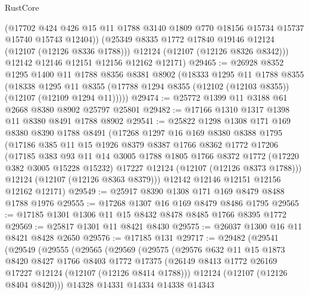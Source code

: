 \begin{lexlean}{RustCore}
\begin{coremodule}
          (@17702
            @424
            @426
            @15
            @11
            @1788
            @3140
            @1809
            @770
            @18156
            @15734
            @15737
            @15740
            @15743
            @12404))
        (@25349 @8335 @1772 @17840 @19146 @12124 (@12107 (@12126 @8336 @1788)))
        @12124
        (@12107 (@12126 @8326 @8342)))
      @12142
      @12146
      @12151
      @12156
      @12162
      @12171)
@29465 := @26928
    @8352
    @1295
    @1400
    @11
    @1788
    @8356
    @8381
    @8902
    (@18333
      @1295
      @11
      @1788
      @8355
      (@18338
        @1295
        @11
        @8355
        (@17788 @1294 @8355 (@12102 (@12103 @8355)) (@12107 (@12109 @1294 @11)))))
@29474 := @25772 @1399 @11 @3188 @61 @2668 @8380 @8902 @25797 @25801
@29482 := @17166 @1310 @1317 @1398 @11 @8380 @8491 @1788 @8902
@29541 := @25822
    @1298
    @1308
    @171
    @169
    @8380
    @8390
    @1788
    @8491
    (@17268
      @1297
      @16
      @169
      @8380
      @8388
      @1795
      (@17186
        @385
        @11
        @15
        @1926
        @8379
        @8387
        @1766
        @8362
        @1772
        @17206
        (@17185
          @383
          @93
          @11
          @14
          @3005
          @1788
          @1805
          @1766
          @8372
          @1772
          (@17220 @382 @3005 @15228 @15232)
          @17227
          @12124
          (@12107 (@12126 @8373 @1788)))
        @12124
        (@12107 (@12126 @8363 @8379)))
      @12142
      @12146
      @12151
      @12156
      @12162
      @12171)
@29549 := @25917 @8390 @1308 @171 @169 @8479 @8488 @1788 @1976
@29555 := @17268 @1307 @16 @169 @8479 @8486 @1795
@29565 := @17185 @1301 @1306 @11 @15 @8432 @8478 @8485 @1766 @8395 @1772
@29569 := @25817 @1301 @11 @8421 @8430
@29575 := @26037 @1300 @16 @11 @8421 @8428 @2650
@29576 := @17185 @131
@29717 := @29482
    (@29541
      (@29549
        (@29555
          (@29565
            (@29569
              (@29575
                (@29576
                  @632
                  @11
                  @15
                  @1873
                  @8420
                  @8427
                  @1766
                  @8403
                  @1772
                  @17375
                  (@26149 @8413 @1772 @26169 @17227 @12124 (@12107 (@12126 @8414 @1788)))
                  @12124
                  (@12107 (@12126 @8404 @8420)))
                @14328
                @14331
                @14334
                @14338
                @14343

\end{coremodule}
\end{lexlean}

